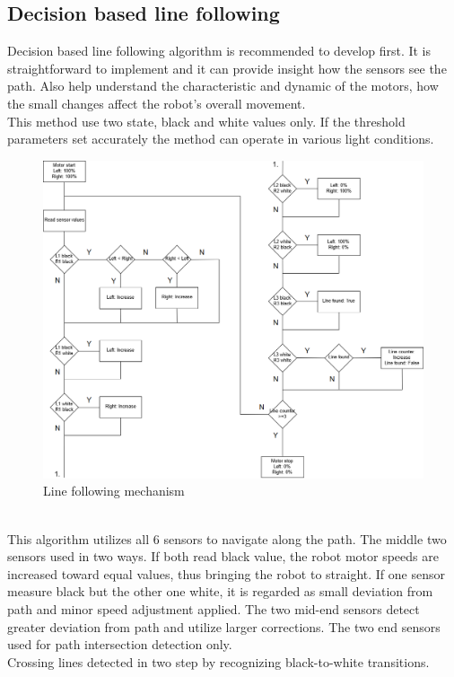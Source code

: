 \documentclass[11pt,a4paper,oneside,article]{memoir}
\begin{document}
\subsection{Decision based line following}
Decision based line following algorithm is recommended to develop first. It is straightforward to implement and it can provide insight how the sensors see the path. Also help understand the characteristic and dynamic of the motors, how the small changes affect the robot's overall movement.\\
This method use two state, black and white values only. If the threshold parameters set accurately the method can operate in various light conditions.
\begin{figure}[h]
	\centering
	\includegraphics[width=15cm]{illustration/If-then-algorithm}
	\caption{Line following mechanism}
	\label{fig:If-then-algorithm}
\end{figure}\\
This algorithm utilizes all 6 sensors to navigate along the path. The middle two sensors used in two ways. If both read black value, the robot motor speeds are increased toward equal values, thus bringing the robot to straight. If one sensor measure black but the other one white, it is regarded as small deviation from path and minor speed adjustment applied. The two mid-end sensors detect greater deviation from path and utilize larger corrections. The two end sensors used for path intersection detection only.\\
Crossing lines detected in two step by recognizing black-to-white transitions.
\end{document}
